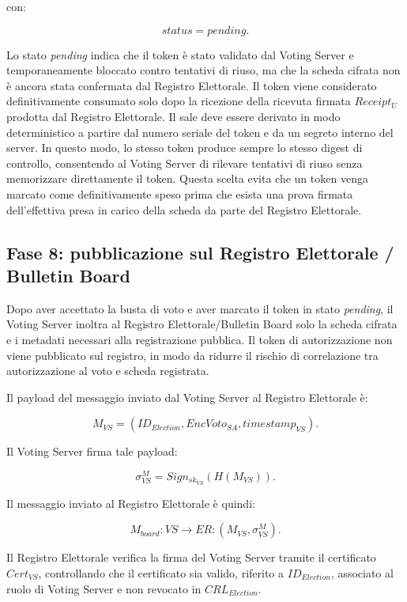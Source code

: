 \documentclass[a4paper,12pt]{article}
\begin{document}
con:

\[
	status = pending.
\]

Lo stato \emph{pending} indica che il token \`e stato validato dal Voting Server e temporaneamente bloccato contro tentativi di riuso, ma che la scheda cifrata non \`e ancora stata confermata dal Registro Elettorale.
Il token viene considerato definitivamente consumato solo dopo la ricezione della ricevuta firmata \(Receipt_U\) prodotta dal Registro Elettorale.
Il sale deve essere derivato in modo deterministico a partire dal numero seriale del token e da un segreto interno del server. 
In questo modo, lo stesso token produce sempre lo stesso digest di controllo, consentendo al Voting Server di rilevare tentativi di riuso senza memorizzare direttamente il token. Questa scelta evita che un token venga marcato come definitivamente speso prima che esista una prova firmata dell'effettiva presa in carico della scheda da parte del Registro Elettorale.



\subsection{Fase 8: pubblicazione sul Registro Elettorale / Bulletin Board}

Dopo aver accettato la busta di voto e aver marcato il token in stato \emph{pending}, il Voting Server inoltra al Registro Elettorale/Bulletin Board solo la scheda cifrata e i metadati necessari alla registrazione pubblica.
Il token di autorizzazione non viene pubblicato sul registro, in modo da ridurre il rischio di correlazione tra autorizzazione al voto e scheda registrata.

Il payload del messaggio inviato dal Voting Server al Registro Elettorale \`e:

\[
	M_{VS} =
	(ID_{Election}, EncVoto_{SA}, timestamp_{VS}).
\]

Il Voting Server firma tale payload:

\[
	\sigma_{VS}^{M} =
	Sign_{sk_{VS}}(H(M_{VS})).
\]

Il messaggio inviato al Registro Elettorale \`e quindi:

\[
	M_{board} : VS \rightarrow ER :
	(M_{VS}, \sigma_{VS}^{M}).
\]

Il Registro Elettorale verifica la firma del Voting Server tramite il certificato \(Cert_{VS}\), controllando che il certificato sia valido, riferito a \(ID_{Election}\), associato al ruolo di Voting Server e non revocato in \(CRL_{Election}\).
\end{document}
